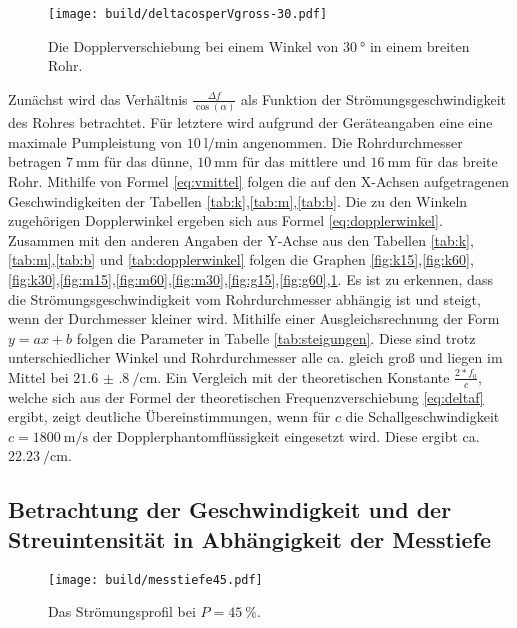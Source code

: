 \begin{figure}
 \centering
 \caption{Die Dopplerverschiebung bei einem Winkel von $\SI{30}{\degree}$ in einem breiten Rohr.}
 \texttt{[image: build/deltacosperVgross-30.pdf]}
 \label{fig:g30}
\end{figure}

Zunächst wird das Verhältnis $\frac{\Delta f}{\cos(\alpha)}$ als Funktion der
Strömungsgeschwindigkeit des Rohres betrachtet. Für letztere wird aufgrund der Geräteangaben eine eine maximale
Pumpleistung von $\SI{10}{\litre\per\minute}$ angenommen. Die Rohrdurchmesser betragen
$\SI{7}{\milli\meter}$ für das dünne, $\SI{10}{\milli\meter}$ für das mittlere und
$\SI{16}{\milli\meter}$ für das breite Rohr. Mithilfe von
Formel \ref{eq:vmittel} folgen die auf den X-Achsen aufgetragenen Geschwindigkeiten der Tabellen \ref{tab:k},\ref{tab:m},\ref{tab:b}.
Die zu den Winkeln zugehörigen Dopplerwinkel ergeben sich aus Formel \ref{eq:dopplerwinkel}.
Zusammen mit den anderen Angaben der Y-Achse aus den Tabellen \ref{tab:k},\ref{tab:m},\ref{tab:b} und \ref{tab:dopplerwinkel} folgen die Graphen
\ref{fig:k15},\ref{fig:k60},\ref{fig:k30},\ref{fig:m15},\ref{fig:m60},\ref{fig:m30},\ref{fig:g15},\ref{fig:g60},\ref{fig:g30}.
Es ist zu erkennen, dass die Strömungsgeschwindigkeit vom Rohrdurchmesser abhängig
ist und steigt, wenn der Durchmesser kleiner wird. Mithilfe einer Ausgleichsrechnung
der Form $y=ax+b$ folgen die Parameter in Tabelle \ref{tab:steigungen}. Diese
sind trotz unterschiedlicher Winkel und Rohrdurchmesser alle ca. gleich groß und
liegen im Mittel bei $\SI{21.6(8)}{\per\centi\meter}$. Ein Vergleich mit der theoretischen
Konstante $\frac{2*f_0}{c}$, welche sich aus der Formel der theoretischen
Frequenzverschiebung \ref{eq:deltaf} ergibt, zeigt deutliche Übereinstimmungen, wenn für $c$
die Schallgeschwindigkeit $c = \SI{1800}{\meter\per\second}$ der Dopplerphantomflüssigkeit
eingesetzt wird. Diese ergibt ca. $\SI{22.23}{\per\centi\meter}$.



\subsection{Betrachtung der Geschwindigkeit und der Streuintensität in Abhängigkeit der Messtiefe}

\begin{figure}
 \centering
 \caption{Das Strömungsprofil bei $P = \SI{45}{\percent}$.}
 \texttt{[image: build/messtiefe45.pdf]}
 \label{fig:P45}
\end{figure}

